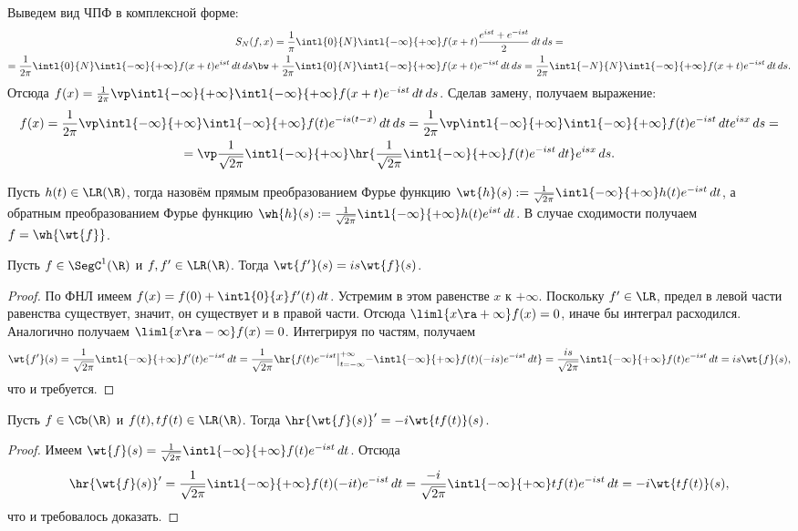 \documentclass[a4paper]{article}
\newcommand{\intlox}{\intl{0}{x}}
\newcommand{\intlii}{\intl{-\infty}{+\infty}}
\newcommand{\frpi}{\frac{1}{\pi}}
\newcommand{\sbs}[2]{\bigl|_{{#1}}^{{#2}}}
\begin{document}
Выведем вид ЧПФ в комплексной форме:
\begin{multline*}
S_N(f,x) = \frpi \intl{0}{N}\intlii f(x+t)\frac{e^{ist}+e^{-ist}}{2}\,dt\,d s=\\=
\frac{1}{2\pi}\intl{0}{N}\intlii f(x+t)e^{ist}\,d t \,d s \bw+
\frac{1}{2\pi}\intl{0}{N}\intlii f(x+t)e^{-ist}\,d t \,d s=\frac{1}{2\pi}\intl{-N}{N}\intlii f(x+t)e^{-ist}\,d t \,d s.
\end{multline*}
Отсюда $f(x) = \frac{1}{2\pi}\vp \intlii \intlii f(x+t)e^{-ist}\,d t
\,d s$. Сделав замену, получаем выражение:
\begin{multline*}
f(x) = \frac{1}{2\pi}\vp \intlii \intlii
f(t)e^{-is(t-x)}\,d t\,d s = \frac{1}{2\pi}\vp \intlii \intlii f(t)e^{-ist}\,d t e^{isx}\,ds=\\=
\vp \frac{1}{\sqrt{2\pi}}\intlii \hr{\frac{1}{\sqrt{2\pi}}\intlii f(t)e^{-ist}\,d t} e^{isx}\,d s.
\end{multline*}

Пусть $h(t) \in\LR(\R)$, тогда назовём прямым преобразованием Фурье функцию $\wt{h}(s) :=
\frac{1}{\sqrt{2\pi}}\intlii h(t)e^{-ist}\,d t$, а обратным преобразованием Фурье функцию
$\wh{h}(s) := \frac{1}{\sqrt{2\pi}}\intlii h(t)e^{ist}\,d t$. В случае сходимости получаем $f =
\wh{\wt{f}}$.

\begin{theorem}
Пусть $f \in\SegC^1(\R)$ и $f, f' \in\LR(\R)$. Тогда $\wt{f'}(s) = is\wt{f}(s)$.
\end{theorem}
\begin{proof}
По ФНЛ имеем $f(x)=f(0) + \intlox f'(t)\,d t$. Устремим в этом равенстве $x$ к $+\infty$.
Поскольку $f' \in\LR$, предел в левой части равенства существует, значит, он существует и в правой
части. Отсюда $\liml{x\ra+\infty} f(x) = 0$, иначе бы интеграл расходился. Аналогично получаем
$\liml{x\ra-\infty}f(x)=0$. Интегрируя по частям, получаем
$$\wt{f'}(s)=\frac{1}{\sqrt{2\pi}}\intlii f'(t)e^{-ist}\,d t =
\frac{1}{\sqrt{2\pi}}\hr{f(t)e^{-ist}\sbs{t=-\infty}{+\infty} - \intlii f(t)(-is)e^{-ist}\,d t}=
\frac{is}{\sqrt{2\pi}}\intlii f(t)e^{-ist}\,d t = is\wt{f}(s),$$
что и требуется.
\end{proof}

\begin{theorem}
Пусть $f \in\Cb(\R)$ и $f(t), tf(t) \in\LR(\R)$. Тогда $\hr{\wt{f}(s)}'=-i\wt{tf(t)}(s)$.
\end{theorem}
\begin{proof}
Имеем $\wt{f}(s) = \frac{1}{\sqrt{2\pi}}\intlii f(t)e^{-ist}\,d t$. Отсюда
$$\hr{\wt{f}(s)}'
=\frac{1}{\sqrt{2\pi}}\intlii f(t)(-it)e^{-ist}\,d t=\frac{-i}{\sqrt{2\pi}}\intlii
tf(t)e^{-ist}\,d t=-i\wt{tf(t)}(s),$$
что и требовалось доказать.
\end{proof}
\end{document}
